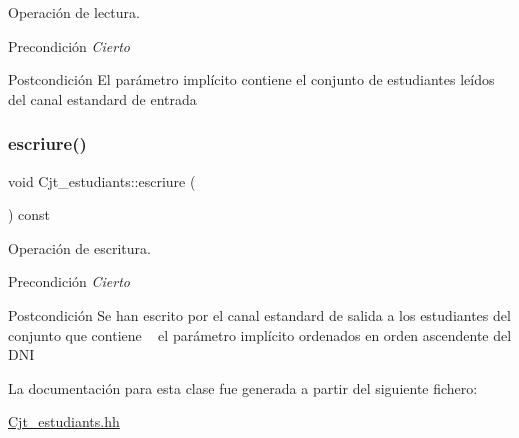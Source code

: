 Operación de lectura. 

\begin{DoxyPrecond}{Precondición}
{\itshape Cierto} 
\end{DoxyPrecond}
\begin{DoxyPostcond}{Postcondición}
El parámetro implícito contiene el conjunto de estudiantes leídos del canal estandard de entrada 
\end{DoxyPostcond}
\mbox{\label{class_cjt__estudiants_a2c25dbd33850025de3389617712f896a}} 
\subsubsection{\texorpdfstring{escriure()}{escriure()}}
{\footnotesize\ttfamily void Cjt\+\_\+estudiants\+::escriure (\begin{DoxyParamCaption}{ }\end{DoxyParamCaption}) const}



Operación de escritura. 

\begin{DoxyPrecond}{Precondición}
{\itshape Cierto} 
\end{DoxyPrecond}
\begin{DoxyPostcond}{Postcondición}
Se han escrito por el canal estandard de salida a los estudiantes del conjunto que contiene ~\newline
 el parámetro implícito ordenados en orden ascendente del D\+NI 
\end{DoxyPostcond}


La documentación para esta clase fue generada a partir del siguiente fichero\+:\begin{DoxyCompactItemize}
\item 
\hyperlink{_cjt__estudiants_8hh}{Cjt\+\_\+estudiants.\+hh}\end{DoxyCompactItemize}
